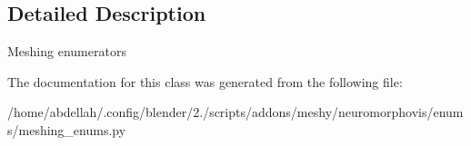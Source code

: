 \subsection{Detailed Description}


\begin{DoxyVerb}Meshing enumerators
\end{DoxyVerb}
 

The documentation for this class was generated from the following file\+:\begin{DoxyCompactItemize}
\item 
/home/abdellah/.\+config/blender/2./scripts/addons/meshy/neuromorphovis/enums/meshing\+\_\+enums.\+py\end{DoxyCompactItemize}
